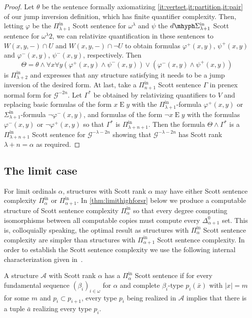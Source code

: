 \documentclass[10pt,a4paper]{amsart}
\newcommand\+[1]{\mathcal{#1}}
\renewcommand\*[1]{\mathbf{#1}}
\renewcommand\=[1]{\text{#1}}
\renewcommand\*[1]{\mathbf{#1}}
\renewcommand{\phi}{\varphi}
\newcommand{\Pinf}[1]{\Pi^{\mathrm{in}}_{#1}}
\newcommand{\Sinf}[1]{\Sigma^{\mathrm{in}}_{#1}}
\newcommand{\dSinf}[1]{d\mhyph\Sigma^{\mathrm{in}}_{#1}}
\newcommand{\nat}{\omega}
\begin{document}
\begin{proof}
  Let $\theta$ be the sentence formally axiomatizing \cref{it:vertset,it:partition,it:pair} of our jump inversion definition, which has finite quantifier complexity. Then, letting $\phi$ be the $\Pinf{\lambda+1}$ Scott sentence for $\omega^\lambda$ and $\psi$ the $\dSinf{\lambda+1}$ Scott sentence for $\omega^\lambda2$, we can relativize quantification in these sentences to $W(x,y,-)\cap U$ and $W(x,y,-)\cap \neg U$ to obtain formulas $\phi^+(x,y)$, $\psi^+(x,y)$ and $\phi^-(x,y)$, $\psi^-(x,y)$, respectively. Then
  \[ \Theta=\theta\land  \forall x\forall y (\phi^+(x,y) \land \psi^-(x,y)) \lor (\phi^-(x,y)\land \psi^+(x,y))\]
  is $\Pinf{\lambda+2}$ and expresses that any structure satisfying it needs to be a jump inversion of the desired form. At last, take a $\Pinf{n+1}$ Scott sentence $\Gamma$ in prenex normal form for $\+G^{-2n}$. Let $\Gamma^*$ be obtained by relativizing quantifiers to $V$ and replacing basic formulas of the form $x\mathrel{E}y$ with the $\Pinf{\lambda+1}$-formula $\phi^+(x,y)$ or $\Sinf{\lambda+1}$-formula $\neg \phi^-(x,y)$, and formulas of the form $\neg x\mathrel{E}y$ with the formulas $\phi^-(x,y)$ or $\neg\phi^+(x,y)$ so that $\Gamma^*$ is $\Pinf{\lambda+n+1}$. Then the formula $\Theta\land \Gamma^*$ is a $\Pinf{\lambda+n+1}$ Scott sentence for $\+G^{-\lambda-2n}$ showing that $\+G^{-\lambda-2n}$ has Scott rank $\lambda+n=\alpha$ as required.
 \end{proof}
 \subsection{The limit case}
 For limit ordinals $\alpha$, structures with Scott rank $\alpha$ may have either Scott sentence complexity $\Pinf{\alpha}$ or $\Pinf{\alpha+1}$. In \cref{thm:limithighforsr} below we produce a computable structure of Scott sentence complexity $\Pinf{\alpha}$ so that every degree computing isomorphisms between all computable copies must compute every $\Delta^0_{\alpha+1}$ set. This is, colloquially speaking, the optimal result as structures with $\Pinf{\alpha}$ Scott sentence complexity are simpler than structures with $\Pinf{\alpha+1}$ Scott sentence complexity. In order to establish the Scott sentence complexity we use the following internal characterization given in~\cite{gonzalez2024}.
 \begin{lemma}\label{lem:unstableseq}
   A structure $\+A$ with Scott rank $\alpha$ has a $\Pinf{\alpha}$ Scott sentence if for every fundamental sequence $(\beta_i)_{i\in\nat}$ for $\alpha$ and complete $\beta_i$-type $p_i(\bar x)$ with $|x|=m$ for some $m$ and $p_i\subset p_{i+1}$, every type $p_i$ being realized in $\+A$ implies that there is a tuple $\bar a$ realizing every type $p_i$.
 \end{lemma}
\end{document}
